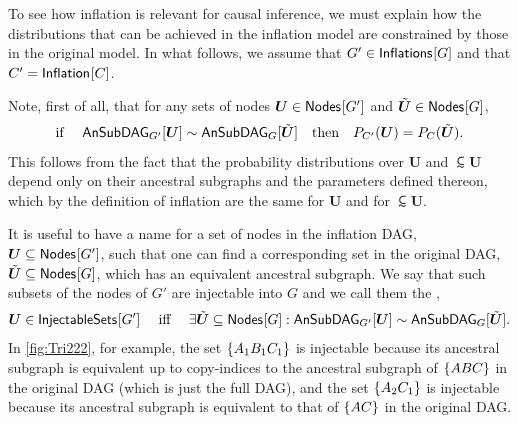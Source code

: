 




To see how inflation is relevant for causal inference, we must explain how the distributions that can be achieved in the inflation model are constrained by those in the original model.  In what follows, we assume that $G' \in \SmallNamedFunction{Inflations}{G}$ and that $C' = \SmallNamedFunction{Inflation}{C}$.

Note, first of all, that for any sets of nodes $\bm{U}\in \SmallNamedFunction{Nodes}{G'}$ and   $\subsim{\bm{U}}\in \SmallNamedFunction{Nodes}{G}$,
\begin{align}\label{eq:coincidingdistrodef}
\text{if }\quad \ansubgraph[G']{\bm{U}}\sim\ansubgraph[G]{\subsim{\bm{U}}}\quad\text{then}\quad \pdf[C']{\bm{U}}=\pdf[C]{\subsim{\bm{U}}}.
\end{align}
This follows from the fact that the probability distributions over $\bm{U}$ and $\subsim{\bm{U}}$ depend only on their ancestral subgraphs and the parameters defined thereon, which by the definition of inflation are the same for $\bm{U}$ and for $\subsim{\bm{U}}$.

It is useful to have a name for a set of nodes in the inflation DAG, $\bm{U} \subseteq \SmallNamedFunction{Nodes}{G'}$, such that one can find a corresponding set in the original DAG, $\subsim{\bm{U}} \subseteq \SmallNamedFunction{Nodes}{G}$, which has an equivalent ancestral subgraph.   We say that such subsets of the nodes of $G'$ are injectable into $G$ and we call them the ,
\begin{align}\label{eq:definjectable}
\bm{U}\in\SmallNamedFunction{InjectableSets}{G'} \quad\text{ iff }\quad \exists \subsim{\bm{U}}\subseteq \SmallNamedFunction{Nodes}{G}: \ansubgraph[G']{\bm{U}}\sim\ansubgraph[G]{\subsim{\bm{U}}}.
\end{align}
In \cref{fig:Tri222}, for example, the set $\brackets{A_1 B_1 C_1}$ is injectable because its ancestral subgraph is equivalent up to copy-indices to the ancestral subgraph of $\brackets{A B C}$ in the original DAG (which is just the full DAG), and the set $\brackets{A_2 C_1}$ is injectable because its ancestral subgraph is equivalent to that of $\brackets{ A C}$ in the original DAG. 

